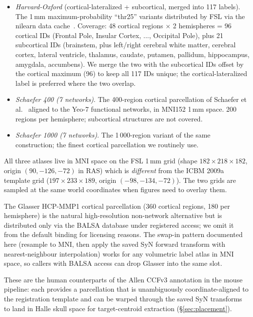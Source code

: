 \documentclass{compactarticle}
\begin{document}
\begin{itemize}
\item {\em Harvard-Oxford} (cortical-lateralized + subcortical, merged
  into 117 labels). The 1\,mm maximum-probability ``thr25'' variants
  distributed by FSL via the nilearn data cache~\cite{harvardoxford}.
  Coverage: 48 cortical regions $\times$ 2 hemispheres = 96 cortical
  IDs (Frontal Pole, Insular Cortex, ..., Occipital Pole), plus 21
  subcortical IDs (brainstem, plus left/right cerebral white matter,
  cerebral cortex, lateral ventricle, thalamus, caudate, putamen,
  pallidum, hippocampus, amygdala, accumbens). We merge the two with
  the subcortical IDs offset by the cortical maximum (96) to keep all
  117 IDs unique; the cortical-lateralized label is preferred where
  the two overlap.

\item {\em Schaefer 400 (7 networks)}. The 400-region cortical
  parcellation of Schaefer et al.~\cite{schaefer2018} aligned to the
  Yeo-7 functional networks, in MNI152 1\,mm space. 200 regions per
  hemisphere; subcortical structures are not covered.

\item {\em Schaefer 1000 (7 networks)}. The 1\,000-region variant of
  the same construction; the finest cortical parcellation we
  routinely use.
\end{itemize}

All three atlases live in MNI space on the FSL 1\,mm grid (shape
$182\times 218\times 182$, origin $(90, -126, -72)$ in RAS) which is
{\em different} from the ICBM 2009a template grid ($197\times 233
\times 189$, origin $(-98, -134, -72)$). The two grids are sampled at
the same world coordinates when figures need to overlay them.

The Glasser HCP-MMP1 cortical parcellation (360 cortical regions, 180
per hemisphere) is the natural high-resolution non-network alternative
but is distributed only via the BALSA database under registered access;
we omit it from the default binding for licensing reasons. The
swap-in pattern documented here (resample to MNI, then apply the
saved SyN forward transform with nearest-neighbour interpolation)
works for any volumetric label atlas in MNI space, so callers with
BALSA access can drop Glasser into the same slot.

These are the human counterparts of the Allen CCFv3 annotation in the
mouse pipeline: each provides a parcellation that is unambiguously
coordinate-aligned to the registration template and can be warped
through the saved SyN transforms to land in Halle skull space for
target-centroid extraction (\S\ref{sec:placement}).
\end{document}

